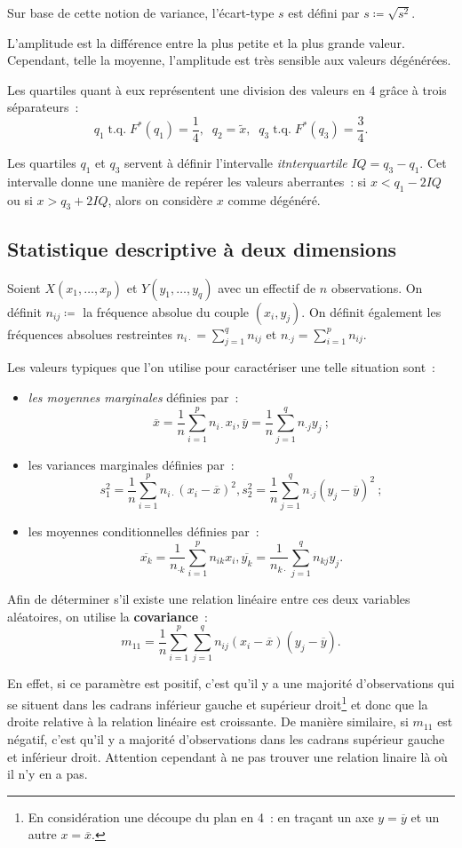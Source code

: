 \documentclass{article}
\DeclareMathOperator{\tq}{\text{ t.q. }}
\begin{document}
			Sur base de cette notion de variance, l'écart-type $s$ est défini par $s \coloneqq \sqrt{s^2}$.

			L'amplitude est la différence entre la plus petite et la plus grande valeur. Cependant, telle la moyenne, l'amplitude est très sensible aux valeurs
			dégénérées.

			Les quartiles quant à eux représentent une division des valeurs en 4 grâce à trois séparateurs~:
			\[q_1 \tq F^*(q_1) = \frac 14, \;\;q_2 = \widetilde x,\;\; q_3 \tq F^*(q_3) = \frac 34.\]

			Les quartiles $q_1$ et $q_3$ servent à définir l'intervalle \textit{itnterquartile} $IQ = q_3-q_1$. Cet intervalle donne une manière de repérer les valeurs
			aberrantes~: si $x < q_1 - 2IQ$ ou si $x > q_3 + 2IQ$, alors on considère $x$ comme dégénéré.

	\subsection{Statistique descriptive à deux dimensions}
		Soient $X(x_1, \ldots, x_p)$ et $Y(y_1, \ldots, y_q)$ avec un effectif de $n$ observations. On définit $n_{ij} \coloneqq$ la fréquence absolue du couple
		$(x_i, y_j)$. On définit également les fréquences absolues restreintes $n_{i \cdot} = \sum_{j=1}^qn_{ij}$ et $n_{\cdot j} = \sum_{i=1}^pn_{ij}$.

		Les valeurs typiques que l'on utilise pour caractériser une telle situation sont~:
		\begin{itemize}
			\item \textit{les moyennes marginales} définies par~:
			\[\overline x = \frac 1n\sum_{i=1}^pn_{i\cdot}x_i, \overline y = \frac 1n \sum_{j=1}^qn_{\cdot j}y_j~;\]
			\item les variances marginales définies par~:
			\[s_1^2 = \frac 1n\sum_{i=1}^pn_{i\cdot}(x_i-\overline x)^2, s_2^2 = \frac 1n\sum_{j=1}^qn_{\cdot j}(y_j-\overline y)^2~;\]
			\item les moyennes conditionnelles définies par~:
			\[\overline{x_k} = \frac 1{n_{\cdot k}}\sum_{i=1}^pn_{ik}x_i, \overline{y_k} = \frac 1{n_{k\cdot}} \sum_{j=1}^qn_{kj}y_j.\]
		\end{itemize}

		Afin de déterminer s'il existe une relation linéaire entre ces deux variables aléatoires, on utilise la \textbf{covariance}~:
		\[m_{11} = \frac 1n\sum_{i=1}^p\sum_{j=1}^qn_{ij}(x_i-\overline x)(y_j-\overline y).\]

		En effet, si ce paramètre est positif, c'est qu'il y a une majorité d'observations qui se situent dans les cadrans inférieur gauche et supérieur
		droit\footnote{En considération une découpe du plan en 4~: en traçant un axe $y = \overline y$ et un autre $x = \overline x$.} et donc que la droite relative
		à la relation linéaire est croissante. De manière similaire, si $m_{11}$ est négatif, c'est qu'il y a majorité d'observations dans les cadrans supérieur gauche
		et inférieur droit. Attention cependant à ne pas trouver une relation linaire là où il n'y en a pas.
\end{document}
